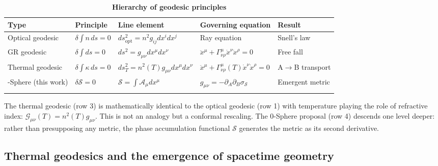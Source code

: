 \documentclass[%
 reprint, amsmath,amssymb, aps, prb, ]{revtex4-2}
\numberwithin{equation}{section}
\begin{document}
\begin{table}[t!]
\centering
\caption{\textbf{Hierarchy of geodesic principles}}
\label{tab:geodesic_hierarchy}
\renewcommand{\arraystretch}{1.4}
\begin{tabular}{p{3.5cm}p{3.7cm}p{4.5cm}p{3.0cm}p{2.3cm}}
\toprule
\textbf{Type} & \textbf{Principle} & \textbf{Line element} & \textbf{Governing equation} & \textbf{Result} \\
\midrule
Optical geodesic
& $\delta\!\int n\,ds = 0$
& $ds_\text{opt}^2 = n^2 g_{ij}dx^idx^j$
& Ray equation
& Snell's law \\
\addlinespace[0.3cm]
GR geodesic
& $\delta\!\int ds = 0$
& $ds^2 = g_{\mu\nu}dx^\mu dx^\nu$
& $\ddot{x}^\mu + \Gamma^\mu_{\nu\rho}\dot{x}^\nu\dot{x}^\rho = 0$
& Free fall \\
\addlinespace[0.3cm]
Thermal geodesic \cite{hanamura24}
& $\delta\!\int \kappa\,ds = 0$
& $ds_T^2 = n^2(T)g_{\mu\nu}dx^\mu dx^\nu$
& $\ddot{x}^\mu + \Gamma^\mu_{\nu\rho}(T)\dot{x}^\nu\dot{x}^\rho = 0$
& A$\to$B transport \\
\addlinespace[0.3cm]
0-Sphere (this work)
& $\delta\mathcal{S} = 0$
& $\mathcal{S} = \int\mathcal{A}_\mu dx^\mu$
& $g_{\mu\nu} = -\partial_A\partial_B\sigma_{\mathcal{S}}$
& Emergent metric \\
\addlinespace[0.2cm]
\bottomrule
\end{tabular}
\vspace{0.2cm}
\begin{minipage}{0.95\textwidth}
\justifying\footnotesize
The thermal geodesic (row 3) is mathematically identical to the optical geodesic (row 1) with temperature playing the role of refractive index: $\mathcal{G}_{\mu\nu}(T) = n^2(T)g_{\mu\nu}$. This is not an analogy but a conformal rescaling. The 0-Sphere proposal (row 4) descends one level deeper: rather than presupposing any metric, the phase accumulation functional $\mathcal{S}$ generates the metric as its second derivative.
\end{minipage}
\end{table}

\subsection{Thermal geodesics and the emergence of spacetime geometry}
\label{subsec:thermal_geodesics}
\end{document}
